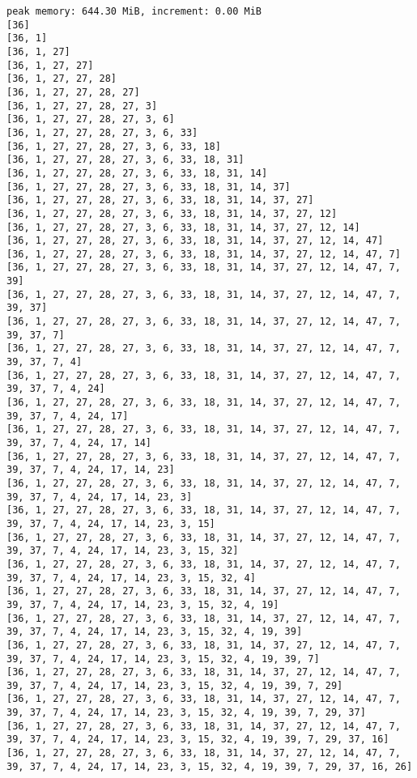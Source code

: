 \documentclass[11pt]{article}
\begin{document}
\begin{Verbatim}[commandchars=\\\{\}]
peak memory: 644.30 MiB, increment: 0.00 MiB
[36]
[36, 1]
[36, 1, 27]
[36, 1, 27, 27]
[36, 1, 27, 27, 28]
[36, 1, 27, 27, 28, 27]
[36, 1, 27, 27, 28, 27, 3]
[36, 1, 27, 27, 28, 27, 3, 6]
[36, 1, 27, 27, 28, 27, 3, 6, 33]
[36, 1, 27, 27, 28, 27, 3, 6, 33, 18]
[36, 1, 27, 27, 28, 27, 3, 6, 33, 18, 31]
[36, 1, 27, 27, 28, 27, 3, 6, 33, 18, 31, 14]
[36, 1, 27, 27, 28, 27, 3, 6, 33, 18, 31, 14, 37]
[36, 1, 27, 27, 28, 27, 3, 6, 33, 18, 31, 14, 37, 27]
[36, 1, 27, 27, 28, 27, 3, 6, 33, 18, 31, 14, 37, 27, 12]
[36, 1, 27, 27, 28, 27, 3, 6, 33, 18, 31, 14, 37, 27, 12, 14]
[36, 1, 27, 27, 28, 27, 3, 6, 33, 18, 31, 14, 37, 27, 12, 14, 47]
[36, 1, 27, 27, 28, 27, 3, 6, 33, 18, 31, 14, 37, 27, 12, 14, 47, 7]
[36, 1, 27, 27, 28, 27, 3, 6, 33, 18, 31, 14, 37, 27, 12, 14, 47, 7, 39]
[36, 1, 27, 27, 28, 27, 3, 6, 33, 18, 31, 14, 37, 27, 12, 14, 47, 7, 39, 37]
[36, 1, 27, 27, 28, 27, 3, 6, 33, 18, 31, 14, 37, 27, 12, 14, 47, 7, 39, 37, 7]
[36, 1, 27, 27, 28, 27, 3, 6, 33, 18, 31, 14, 37, 27, 12, 14, 47, 7, 39, 37, 7, 4]
[36, 1, 27, 27, 28, 27, 3, 6, 33, 18, 31, 14, 37, 27, 12, 14, 47, 7, 39, 37, 7, 4, 24]
[36, 1, 27, 27, 28, 27, 3, 6, 33, 18, 31, 14, 37, 27, 12, 14, 47, 7, 39, 37, 7, 4, 24, 17]
[36, 1, 27, 27, 28, 27, 3, 6, 33, 18, 31, 14, 37, 27, 12, 14, 47, 7, 39, 37, 7, 4, 24, 17, 14]
[36, 1, 27, 27, 28, 27, 3, 6, 33, 18, 31, 14, 37, 27, 12, 14, 47, 7, 39, 37, 7, 4, 24, 17, 14, 23]
[36, 1, 27, 27, 28, 27, 3, 6, 33, 18, 31, 14, 37, 27, 12, 14, 47, 7, 39, 37, 7, 4, 24, 17, 14, 23, 3]
[36, 1, 27, 27, 28, 27, 3, 6, 33, 18, 31, 14, 37, 27, 12, 14, 47, 7, 39, 37, 7, 4, 24, 17, 14, 23, 3, 15]
[36, 1, 27, 27, 28, 27, 3, 6, 33, 18, 31, 14, 37, 27, 12, 14, 47, 7, 39, 37, 7, 4, 24, 17, 14, 23, 3, 15, 32]
[36, 1, 27, 27, 28, 27, 3, 6, 33, 18, 31, 14, 37, 27, 12, 14, 47, 7, 39, 37, 7, 4, 24, 17, 14, 23, 3, 15, 32, 4]
[36, 1, 27, 27, 28, 27, 3, 6, 33, 18, 31, 14, 37, 27, 12, 14, 47, 7, 39, 37, 7, 4, 24, 17, 14, 23, 3, 15, 32, 4, 19]
[36, 1, 27, 27, 28, 27, 3, 6, 33, 18, 31, 14, 37, 27, 12, 14, 47, 7, 39, 37, 7, 4, 24, 17, 14, 23, 3, 15, 32, 4, 19, 39]
[36, 1, 27, 27, 28, 27, 3, 6, 33, 18, 31, 14, 37, 27, 12, 14, 47, 7, 39, 37, 7, 4, 24, 17, 14, 23, 3, 15, 32, 4, 19, 39, 7]
[36, 1, 27, 27, 28, 27, 3, 6, 33, 18, 31, 14, 37, 27, 12, 14, 47, 7, 39, 37, 7, 4, 24, 17, 14, 23, 3, 15, 32, 4, 19, 39, 7, 29]
[36, 1, 27, 27, 28, 27, 3, 6, 33, 18, 31, 14, 37, 27, 12, 14, 47, 7, 39, 37, 7, 4, 24, 17, 14, 23, 3, 15, 32, 4, 19, 39, 7, 29, 37]
[36, 1, 27, 27, 28, 27, 3, 6, 33, 18, 31, 14, 37, 27, 12, 14, 47, 7, 39, 37, 7, 4, 24, 17, 14, 23, 3, 15, 32, 4, 19, 39, 7, 29, 37, 16]
[36, 1, 27, 27, 28, 27, 3, 6, 33, 18, 31, 14, 37, 27, 12, 14, 47, 7, 39, 37, 7, 4, 24, 17, 14, 23, 3, 15, 32, 4, 19, 39, 7, 29, 37, 16, 26]

\end{Verbatim}
\end{document}
